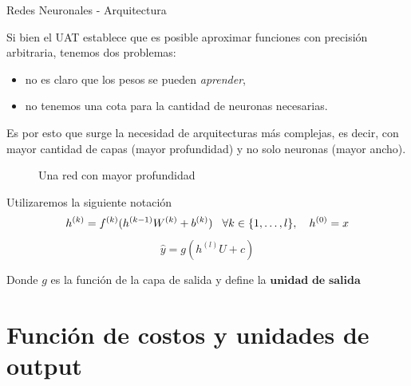 \documentclass[handout, 9pt]{beamer}
\begin{document}
\begin{frame}{Redes Neuronales - Arquitectura}

Si bien el UAT establece que es posible aproximar funciones con precisión arbitraria, tenemos dos problemas: 
\begin{itemize}
\item no es claro que los pesos se pueden \emph{aprender}, 
\item no tenemos una cota para la cantidad de neuronas necesarias.
\end{itemize} 
Es por esto que surge la necesidad de arquitecturas más complejas, es decir, con mayor cantidad de capas (mayor profundidad) y no solo neuronas (mayor ancho). \pause

\begin{figure}[H]
  \centering
  \caption{Una red con mayor profundidad}
\end{figure}

\pause 

Utilizaremos la siguiente notación 
\begin{equation}
h^{(k)} = f^{(k)}(h^{(k-1)}W^{(k)} + b^{(k)}) \hspace{0.3cm} \forall k \in \{1 ,\dots, l\}, \quad h^{(0)}=x
\end{equation}
\begin{equation}
\hat{y} = g(h^{(l)}U + c)
\end{equation}

Donde $g$ es la función de la capa de salida y define la $\textbf{unidad de salida}$

\end{frame}

\section{Función de costos y unidades de output}
\end{document}
